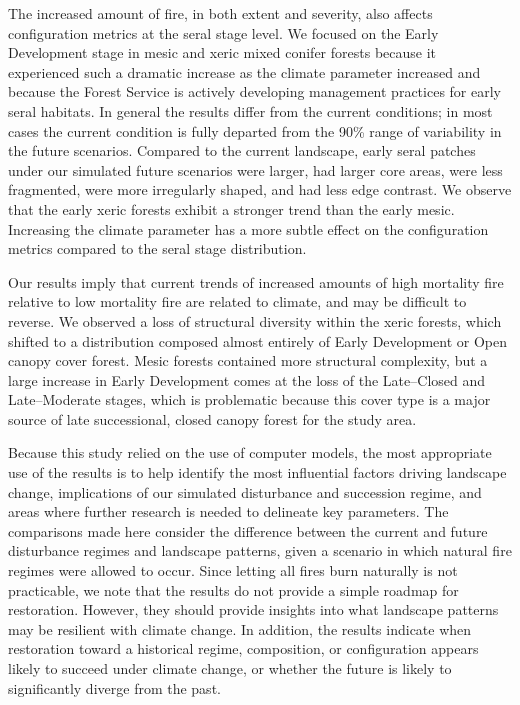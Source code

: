 The increased amount of fire, in both extent and severity, also affects configuration metrics at the seral stage level. We focused on the Early Development stage in mesic and xeric mixed conifer forests because it experienced such a dramatic increase as the climate parameter increased and because the Forest Service is actively developing management practices for early seral habitats. In general the results differ from the current conditions; in most cases the current condition is fully departed from the 90\% range of variability in the future scenarios. Compared to the current landscape, early seral patches under our simulated future scenarios were larger, had larger core areas, were less fragmented, were more irregularly shaped, and had less edge contrast. We observe that the early xeric forests exhibit a stronger trend than the early mesic. Increasing the climate parameter has a more subtle effect on the configuration metrics compared to the seral stage distribution.

Our results imply that current trends of increased amounts of high mortality fire relative to low mortality fire are related to climate, and may be difficult to reverse. We observed a loss of structural diversity within the xeric forests, which shifted to a distribution composed almost entirely of Early Development or Open canopy cover forest. Mesic forests contained more structural complexity, but a large increase in Early Development comes at the loss of the Late--Closed and Late--Moderate stages, which is problematic because this cover type is a major source of late successional, closed canopy forest for the study area.

Because this study relied on the use of computer models, the most appropriate use of the results is to help identify the most influential factors driving landscape change, implications of our simulated disturbance and succession regime, and areas where further research is needed to delineate key parameters. The comparisons made here consider the difference between the current and future disturbance regimes and landscape patterns, given a scenario in which natural fire regimes were allowed to occur. Since letting all fires burn naturally is not practicable, we note that the results do not provide a simple roadmap for restoration. However, they should provide insights into what landscape patterns may be resilient with climate change. In addition, the results indicate when restoration toward a historical regime, composition, or configuration appears likely to succeed under climate change, or whether the future is likely to significantly diverge from the past.

